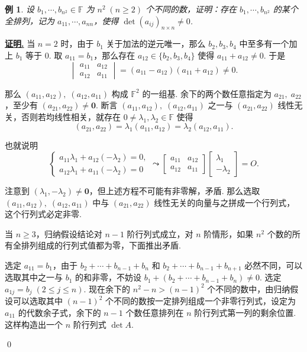\documentclass[10pt,openany]{article}
\theoremstyle{thmstyle} %
\theoremstyle{defstyle} %
\theoremstyle{prostyle} %
\theoremstyle{exastyle}
\newtheorem{example}[theorem]{例}
\theoremstyle{remstyle}
\renewenvironment{proof}[1][证明]{\par\underline{\textbf{#1.}} \;\fangsong}{\qed\par}
\newcommand{\F}{\mathbb{F}}
\begin{document}
\begin{example}
	设 \( b_1,\cdots,b_{n^2} \in \F \) 为 \( n^2 \; (n \geq 2) \) 个不同的数，证明：存在 \( b_1,\cdots,b_{n^2} \) 的某个全排列，记为 \( a_{11},\cdots,a_{nn} \)，使得 \( \det(a_{ij})_{n \times n} \neq 0 \).
\end{example}

\begin{proof}
	当 \( n=2 \) 时，由于 \( b_1 \) 关于加法的逆元唯一，那么 \( b_2,b_3,b_4 \) 中至多有一个加上 \( b_1 \) 等于 0. 取 \( a_{11}=b_1 \)，那么存在 \( a_{12} \in \{b_2,b_3,b_4\} \) 使得 \( a_{11}+a_{12} \neq 0 \). 于是
	\[ \begin{vmatrix}
		a_{11} & a_{12} \\
		a_{12} & a_{11}
	\end{vmatrix}= (a_{11}-a_{12})(a_{11}+a_{12}) \neq 0. \]
	
	那么 \( (a_{11},a_{12}), \; (a_{12},a_{11}) \) 构成 \( \F^2 \) 的一组基. 余下的两个数任意指定为 \( a_{21}, \; a_{22} \)，至少有 \( (a_{21},a_{22}) \neq \bm{0} \). 断言 \( (a_{11},a_{12}), \; (a_{12},a_{11}) \) 之一与 \( (a_{21},a_{22}) \) 线性无关，否则若均线性相关，就存在 \( 0 \neq \lambda_1, \lambda_2 \in \F \) 使得 
	\[ (a_{21},a_{22})=\lambda_1 (a_{11},a_{12})= \lambda_2 (a_{12},a_{11}). \]
	
	也就说明
	\[ \left\{ \begin{array}{l}
		a_{11} \lambda_1+ a_{12} (-\lambda_2)=0, \\
		a_{12} \lambda_1+ a_{11} (-\lambda_2)=0
	\end{array}\right. \leadsto \begin{bmatrix}
	a_{11} & a_{12} \\
	a_{12} & a_{11}
	\end{bmatrix}\begin{bmatrix}
	\lambda_1 \\
	-\lambda_2
	\end{bmatrix}=O. \]
	
	注意到 \( (\lambda_1,-\lambda_2) \neq \bm{0} \)，但上述方程不可能有非零解，矛盾. 那么选取 \( (a_{11},a_{12}), \; (a_{12},a_{11}) \) 中与 \( (a_{21},a_{22}) \) 线性无关的向量与之拼成一个行列式，这个行列式必定非零. 
	
	当 \( n \geq 3 \)，归纳假设结论对 \( n-1 \) 阶行列式成立，对 \( n \) 阶情形，如果 \( n^2 \) 个数的所有全排列组成的行列式值都为零，下面推出矛盾.
	
	选定 \( a_{11}=b_1 \)，由于 \( b_2+\cdots+b_{n-1}+b_n \) 和 \( b_2+\cdots+b_{n-1}+b_{n+1} \) 必然不同，可以选取其中之一与 \( b_1 \) 的和非零，不妨设 \( b_1+(b_2+\cdots+b_{n-1}+b_n) \neq 0 \). 选定 \( a_{1j}=b_j \; (2 \leq j \leq n) \). 现在余下的 \( n^2-n>(n-1)^2 \) 个不同的数中，由归纳假设可以选取其中 \( (n-1)^2 \) 个不同的数按一定排列组成一个非零行列式，设定为 \( a_{11} \) 的代数余子式，余下的 \( n-1 \) 个数任意排列在 \( n \) 阶行列式第一列的剩余位置. 这样构造出一个 \( n \) 阶行列式 \( \det A \). 
	

\end{proof}
\end{document}
